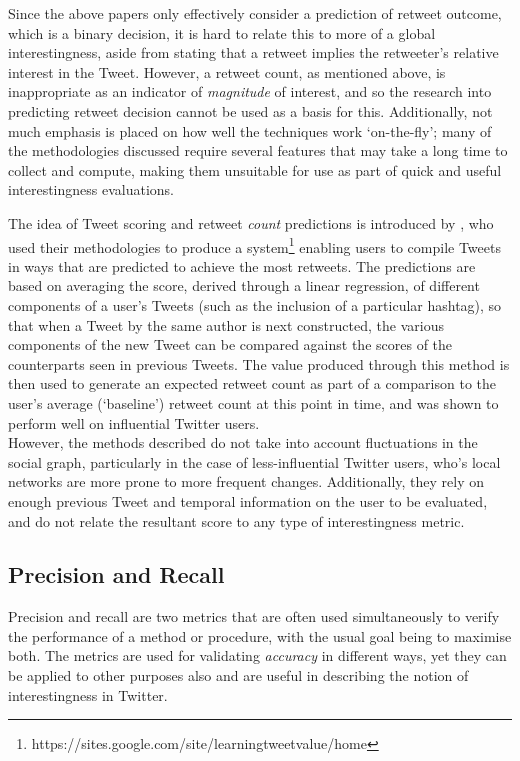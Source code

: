 Since the above papers only effectively consider a prediction of retweet outcome, which is a binary decision, it is hard to relate this to more of a global interestingness, aside from stating that a retweet implies the retweeter's relative interest in the Tweet. However, a retweet count, as mentioned above, is inappropriate as an indicator of \textit{magnitude} of interest, and so the research into predicting retweet decision cannot be used as a basis for this. Additionally, not much emphasis is placed on how well the techniques work `on-the-fly'; many of the methodologies discussed require several features that may take a long time to collect and compute, making them unsuitable for use as part of quick and useful interestingness evaluations.

The idea of Tweet scoring and retweet \textit{count} predictions is introduced by \cite{gransee12}, who used their methodologies to produce a system\footnote{https://sites.google.com/site/learningtweetvalue/home} enabling users to compile Tweets in ways that are predicted to achieve the most retweets. The predictions are based on averaging the score, derived through a linear regression, of different components of a user's Tweets (such as the inclusion of a particular hashtag), so that when a Tweet by the same author is next constructed, the various components of the new Tweet can be compared against the scores of the counterparts seen in previous Tweets. The value produced through this method is then used to generate an expected retweet count as part of a comparison to the user's average (`baseline') retweet count at this point in time, and was shown to perform well on influential Twitter users.\\
However, the methods described do not take into account fluctuations in the social graph, particularly in the case of less-influential Twitter users, who's local networks are more prone to more frequent changes. Additionally, they rely on enough previous Tweet and temporal information on the user to be evaluated, and do not relate the resultant score to any type of interestingness metric.


\subsection{Precision and Recall}
Precision and recall are two metrics that are often used simultaneously to verify the performance of a method or procedure, with the usual goal being to maximise both. The metrics are used for validating \textit{accuracy} in different ways, yet they can be applied to other purposes also and are useful in describing the notion of interestingness in Twitter.

